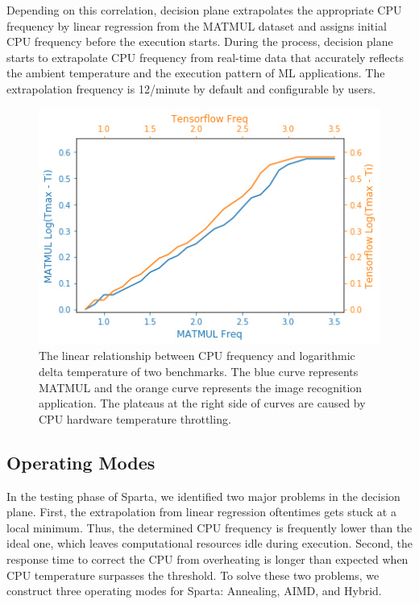  Depending on this correlation, decision plane extrapolates the appropriate CPU frequency by linear regression from the MATMUL dataset and assigns initial CPU frequency before the execution starts. During the process, decision plane starts to extrapolate CPU frequency from real-time data that accurately reflects the ambient temperature and the execution pattern of ML applications. The extrapolation frequency is 12/minute by default and configurable by users.

\begin{figure}[ht]
\centering
\includegraphics[scale=0.5]{figures/matmul-tensorflow.png}
\caption{The linear relationship between CPU frequency and logarithmic delta temperature of two benchmarks. The blue curve represents MATMUL and the orange curve represents the image recognition application. The plateaus at the right side of curves are caused by CPU hardware temperature throttling. } \label{fig:mat-vs-tf}
\end{figure}


\subsection{Operating Modes}

In the testing phase of Sparta, we identified two major problems in the decision plane. First, the extrapolation from linear regression oftentimes gets stuck at a local minimum. Thus, the determined CPU frequency is frequently lower than the ideal one, which leaves computational resources idle during execution. Second, the response time to correct the CPU from overheating is longer than expected when CPU temperature surpasses the threshold. To solve these two problems, we construct three operating modes for Sparta: Annealing, AIMD, and Hybrid. 

